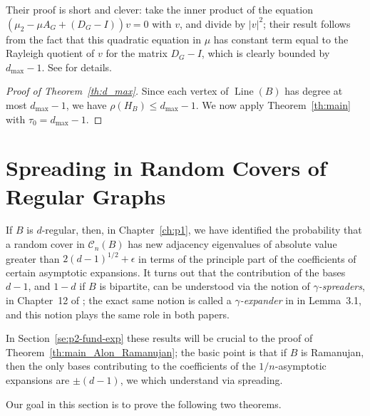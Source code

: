\documentclass{memo-l}
\theoremstyle{plain}
\theoremstyle{definition}
\numberwithin{section}{chapter}
\numberwithin{equation}{chapter}
\DeclareMathOperator{\Line}{Line}
\theoremstyle{plain}
\theoremstyle{definition}
\newcommand\cC{\mathcal{C}}
\begin{document}
Their proof is short and clever: take the inner product of the equation
$(\mu_2 - \mu A_G  + (D_G-I))v=0$ with $v$, and divide by $|v|^2$;
their result follows from the fact that this quadratic equation in $\mu$
has constant term equal to the Rayleigh quotient of $v$ for the
matrix $D_G-I$, which is clearly bounded by $d_{\max{}}-1$.
See \cite{kotani} for details.

\begin{proof}[Proof of Theorem~\ref{th:d_max}]
Since each vertex of $\Line(B)$ has degree at most $d_{\max}-1$, we have
$\rho(H_B)\le d_{\max}-1$.
We now apply Theorem~\ref{th:main} with $\tau_0=d_{\max}-1$.
\end{proof}



\section{Spreading in Random Covers of Regular Graphs}
\label{se:p2-spread}

If $B$ is $d$-regular, then, 
in Chapter~\ref{ch:p1}, we have identified the probability that
a random cover in $\cC_n(B)$ has new adjacency eigenvalues of absolute
value greater than $2(d-1)^{1/2}+\epsilon$ in terms of the
principle part of the \glspl{coefficient} of certain
\glspl{asymptotic expansion}.  
It turns out that the contribution of the bases $d-1$, and $1-d$ if
$B$ is bipartite, can be understood via the notion
of {\em $\gamma$-spreaders}, in Chapter~12 of \cite{friedman_alon};
the exact same notion is called a
{\em $\gamma$-expander} in \cite{friedman_random_graphs}
in Lemma~3.1, and this notion plays the same role in both papers.


In Section~\ref{se:p2-fund-exp} these results will
be crucial to the proof of Theorem~\ref{th:main_Alon_Ramanujan};
the basic point is that if $B$ is Ramanujan, then the only bases
contributing to the coefficients of the $1/n$-asymptotic expansions
are $\pm(d-1)$, we which understand via spreading.

Our goal in this section is to prove the following two theorems.
\end{document}
